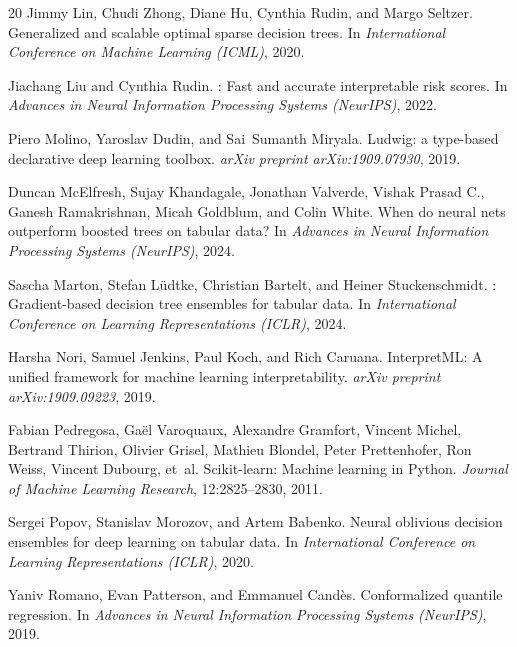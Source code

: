 \documentclass[11pt]{article}
\begin{document}
\begin{thebibliography}{20}
Jimmy Lin, Chudi Zhong, Diane Hu, Cynthia Rudin, and Margo Seltzer.
\newblock Generalized and scalable optimal sparse decision trees.
\newblock In \emph{International Conference on Machine Learning (ICML)}, 2020.

Jiachang Liu and Cynthia Rudin.
: Fast and accurate interpretable risk scores.
\newblock In \emph{Advances in Neural Information Processing Systems (NeurIPS)}, 2022.

Piero Molino, Yaroslav Dudin, and Sai~Sumanth Miryala.
\newblock Ludwig: a type-based declarative deep learning toolbox.
\newblock \emph{arXiv preprint arXiv:1909.07930}, 2019.

Duncan McElfresh, Sujay Khandagale, Jonathan Valverde, Vishak Prasad C.,
  Ganesh Ramakrishnan, Micah Goldblum, and Colin White.
\newblock When do neural nets outperform boosted trees on tabular data?
\newblock In \emph{Advances in Neural Information Processing Systems (NeurIPS)}, 2024.

Sascha Marton, Stefan L{\"u}dtke, Christian Bartelt, and Heiner Stuckenschmidt.
: Gradient-based decision tree ensembles for tabular data.
\newblock In \emph{International Conference on Learning Representations (ICLR)}, 2024.

Harsha Nori, Samuel Jenkins, Paul Koch, and Rich Caruana.
\newblock Interpret{ML}: A unified framework for machine learning
  interpretability.
\newblock \emph{arXiv preprint arXiv:1909.09223}, 2019.

Fabian Pedregosa, Ga{\"e}l Varoquaux, Alexandre Gramfort, Vincent Michel,
  Bertrand Thirion, Olivier Grisel, Mathieu Blondel, Peter Prettenhofer,
  Ron Weiss, Vincent Dubourg, et~al.
\newblock Scikit-learn: Machine learning in {P}ython.
\newblock \emph{Journal of Machine Learning Research}, 12:2825--2830, 2011.

Sergei Popov, Stanislav Morozov, and Artem Babenko.
\newblock Neural oblivious decision ensembles for deep learning on tabular
  data.
\newblock In \emph{International Conference on Learning Representations (ICLR)}, 2020.

Yaniv Romano, Evan Patterson, and Emmanuel Cand\`{e}s.
\newblock Conformalized quantile regression.
\newblock In \emph{Advances in Neural Information Processing Systems (NeurIPS)}, 2019.


\end{thebibliography}
\end{document}
